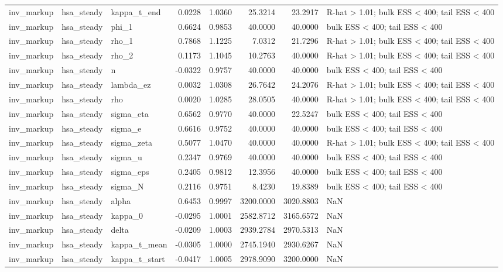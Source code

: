 \begin{tabular}{lllrrrrl}
inv\_markup & hsa\_steady & kappa\_t\_end & 0.0228 & 1.0360 & 25.3214 & 23.2917 & R-hat > 1.01; bulk ESS < 400; tail ESS < 400 \\
inv\_markup & hsa\_steady & phi\_1 & 0.6624 & 0.9853 & 40.0000 & 40.0000 & bulk ESS < 400; tail ESS < 400 \\
inv\_markup & hsa\_steady & rho\_1 & 0.7868 & 1.1225 & 7.0312 & 21.7296 & R-hat > 1.01; bulk ESS < 400; tail ESS < 400 \\
inv\_markup & hsa\_steady & rho\_2 & 0.1173 & 1.1045 & 10.2763 & 40.0000 & R-hat > 1.01; bulk ESS < 400; tail ESS < 400 \\
inv\_markup & hsa\_steady & n & -0.0322 & 0.9757 & 40.0000 & 40.0000 & bulk ESS < 400; tail ESS < 400 \\
inv\_markup & hsa\_steady & lambda\_ez & 0.0032 & 1.0308 & 26.7642 & 24.2076 & R-hat > 1.01; bulk ESS < 400; tail ESS < 400 \\
inv\_markup & hsa\_steady & rho & 0.0020 & 1.0285 & 28.0505 & 40.0000 & R-hat > 1.01; bulk ESS < 400; tail ESS < 400 \\
inv\_markup & hsa\_steady & sigma\_eta & 0.6562 & 0.9770 & 40.0000 & 22.5247 & bulk ESS < 400; tail ESS < 400 \\
inv\_markup & hsa\_steady & sigma\_e & 0.6616 & 0.9752 & 40.0000 & 40.0000 & bulk ESS < 400; tail ESS < 400 \\
inv\_markup & hsa\_steady & sigma\_zeta & 0.5077 & 1.0470 & 40.0000 & 40.0000 & R-hat > 1.01; bulk ESS < 400; tail ESS < 400 \\
inv\_markup & hsa\_steady & sigma\_u & 0.2347 & 0.9769 & 40.0000 & 40.0000 & bulk ESS < 400; tail ESS < 400 \\
inv\_markup & hsa\_steady & sigma\_eps & 0.2405 & 0.9812 & 12.3956 & 40.0000 & bulk ESS < 400; tail ESS < 400 \\
inv\_markup & hsa\_steady & sigma\_N & 0.2116 & 0.9751 & 8.4230 & 19.8389 & bulk ESS < 400; tail ESS < 400 \\
inv\_markup & hsa\_steady & alpha & 0.6453 & 0.9997 & 3200.0000 & 3020.8803 & NaN \\
inv\_markup & hsa\_steady & kappa\_0 & -0.0295 & 1.0001 & 2582.8712 & 3165.6572 & NaN \\
inv\_markup & hsa\_steady & delta & -0.0209 & 1.0003 & 2939.2784 & 2970.5313 & NaN \\
inv\_markup & hsa\_steady & kappa\_t\_mean & -0.0305 & 1.0000 & 2745.1940 & 2930.6267 & NaN \\
inv\_markup & hsa\_steady & kappa\_t\_start & -0.0417 & 1.0005 & 2978.9090 & 3200.0000 & NaN \\

\end{tabular}
